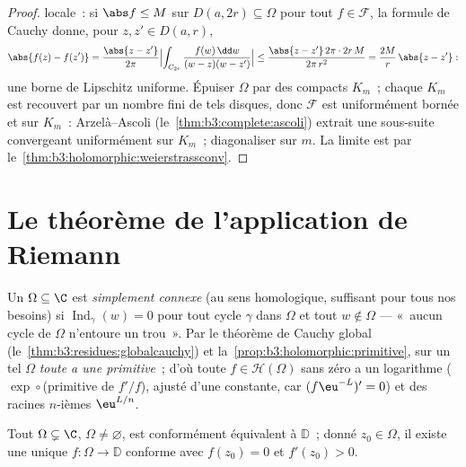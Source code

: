 \begin{proof}
 locale~: si $\abs f \leq M$ sur $D(a, 2r)
\subseteq \Omega$ pour tout $f \in \mathcal F$, la formule de
Cauchy donne, pour $z, z' \in D(a, r)$,
\[
\abs{f(z) - f(z')} = \frac{\abs{z - z'}}{2\pi}
\Bigl|\int_{C_{2r}}\frac{f(w)\,\dd w}{(w-z)(w-z')}\Bigr|
\leq \frac{\abs{z - z'}\,2\pi\cdot2r\,M}{2\pi\,r^2}
= \frac{2M}{r}\,\abs{z - z'} :
\]
une borne de Lipschitz uniforme. Épuiser $\Omega$ par des
compacts $K_m$~; chaque $K_m$ est recouvert par un nombre
fini de tels disques, donc $\mathcal F$ est uniformément
bornée et  sur $K_m$~: Arzelà--Ascoli
(le~\cref{thm:b3:complete:ascoli}) extrait une sous-suite
convergeant uniformément sur $K_m$~; diagonaliser sur $m$.
La limite est  par
le~\cref{thm:b3:holomorphic:weierstrassconv}.
\end{proof}

\section{Le théorème de l'application de Riemann}

\begin{definition}\label{def:b3:conformal:simplyconnected}
Un   $\Omega \subseteq \C$ est \emph{simplement
connexe} (au sens
homologique, suffisant pour tous nos besoins) si
$\operatorname{Ind}_\gamma(w) = 0$ pour tout cycle $\gamma$
dans $\Omega$ et tout $w \notin \Omega$ --- «~aucun cycle de
$\Omega$ n'entoure un trou~». Par le théorème de Cauchy
global (le~\cref{thm:b3:residues:globalcauchy}) et
la~\cref{prop:b3:holomorphic:primitive}, sur un tel $\Omega$
\emph{toute  a une primitive}~; d'où
toute $f \in \mathcal H(\Omega)$ sans zéro a un logarithme
 ($\exp\circ$(primitive de $f'/f$), ajusté d'une
constante, car $(f\eu^{-L})' = 0$) et des racines $n$-ièmes
 $\eu^{L/n}$.
\end{definition}

\begin{theorem}
\label{thm:b3:conformal:rmt}
Tout   $\Omega \subsetneq \C$,
$\Omega \neq \varnothing$, est conformément équivalent à
$\mathbb D$~; donné $z_0 \in \Omega$, il existe une unique
$f \colon \Omega \to \mathbb D$ conforme avec $f(z_0) = 0$
et $f'(z_0) > 0$.
\end{theorem}

